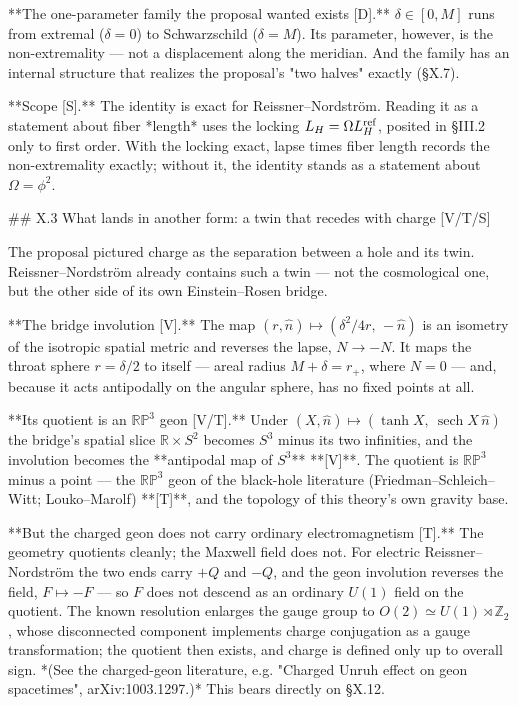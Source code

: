 **The one-parameter family the proposal wanted exists [D].** $\delta\in[0,M]$ runs from extremal ($\delta = 0$) to Schwarzschild ($\delta = M$). Its parameter, however, is the non-extremality — not a displacement along the meridian. And the family has an internal structure that realizes the proposal's "two halves" exactly (§X.7).

**Scope [S].** The identity is exact for Reissner–Nordström. Reading it as a statement about fiber *length* uses the locking $L_H = \Omega L_H^{\rm ref}$, posited in §III.2 only to first order. With the locking exact, lapse times fiber length records the non-extremality exactly; without it, the identity stands as a statement about $\Omega = \phi^2$.

## X.3 What lands in another form: a twin that recedes with charge [V/T/S]

The proposal pictured charge as the separation between a hole and its twin. Reissner–Nordström already contains such a twin — not the cosmological one, but the other side of its own Einstein–Rosen bridge.

**The bridge involution [V].** The map $(r,\hat n)\mapsto(\delta^2/4r,\,-\hat n)$ is an isometry of the isotropic spatial metric and reverses the lapse, $N\to-N$. It maps the throat sphere $r = \delta/2$ to itself — areal radius $M+\delta = r_+$, where $N = 0$ — and, because it acts antipodally on the angular sphere, has no fixed points at all.

**Its quotient is an $\mathbb{RP}^3$ geon [V/T].** Under $(X,\hat n)\mapsto(\tanh X,\ \operatorname{sech}X\,\hat n)$ the bridge's spatial slice $\mathbb{R}\times S^2$ becomes $S^3$ minus its two infinities, and the involution becomes the **antipodal map of $S^3$** **[V]**. The quotient is $\mathbb{RP}^3$ minus a point — the $\mathbb{RP}^3$ geon of the black-hole literature (Friedman–Schleich–Witt; Louko–Marolf) **[T]**, and the topology of this theory's own gravity base.

**But the charged geon does not carry ordinary electromagnetism [T].** The geometry quotients cleanly; the Maxwell field does not. For electric Reissner–Nordström the two ends carry $+Q$ and $-Q$, and the geon involution reverses the field, $F\mapsto-F$ — so $F$ does not descend as an ordinary $U(1)$ field on the quotient. The known resolution enlarges the gauge group to $O(2)\simeq U(1)\rtimes\mathbb{Z}_2$, whose disconnected component implements charge conjugation as a gauge transformation; the quotient then exists, and charge is defined only up to overall sign. *(See the charged-geon literature, e.g. "Charged Unruh effect on geon spacetimes", arXiv:1003.1297.)* This bears directly on §X.12.

